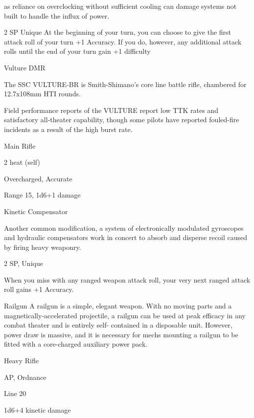 as reliance on overclocking without sufficient cooling can damage systems not built to handle the influx of  
power.   

                                                                                                                        


2 SP  
Unique  
At the beginning of your turn, you can choose to give the first attack roll of your turn +1  
Accuracy. If you do, however, any additional attack rolls until the end of your turn gain +1  
difficulty
 

Vulture DMR  

The SSC VULTURE-BR is Smith-Shimano’s core line battle rifle, chambered for 12.7x108mm HTI rounds.  

Field performance reports of the VULTURE report low TTK rates and satisfactory all-theater capability,  
though some pilots have reported fouled-fire incidents as a result of the high burst rate.   

Main Rifle
 
2 heat (self)
 
Overcharged, Accurate
 
Range 15, 1d6+1 damage
 

Kinetic Compensator
 
Another common modification, a system of electronically modulated gyroscopes and hydraulic  
compensators work in concert to absorb and disperse recoil caused by firing heavy weaponry.   

2 SP, Unique
 
When you miss with any ranged weapon attack roll, your very next ranged attack roll gains +1  
Accuracy.
 

Railgun  
A railgun is a simple, elegant weapon. With no moving parts and a magnetically-accelerated  
projectile, a railgun can be used at peak efficacy in any combat theater and is entirely self- 
contained in a disposable unit. However, power draw is massive, and it is necessary for mechs  
mounting a railgun to be fitted with a core-charged auxiliary power pack.   
   
Heavy Rifle
 
AP, Ordnance
 
Line 20
 
1d6+4 kinetic damage
 